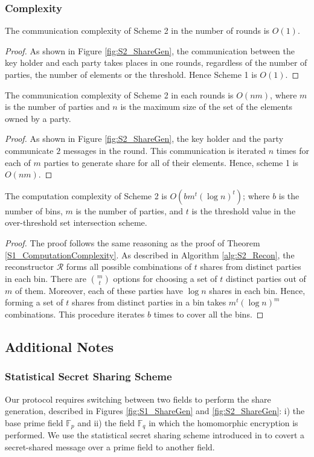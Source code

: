 \subsubsection{Complexity}
\begin{theorem}
The communication complexity of Scheme 2 in the number of rounds is $O(1)$. 
\end{theorem}
\begin{proof}
As shown in Figure \ref{fig:S2_ShareGen}, the communication between the key holder and each party takes places in one rounds, regardless of the number of parties, the number of elements or the threshold. Hence Scheme 1 is $O(1)$. 
\end{proof}
\begin{theorem}
The communication complexity of Scheme 2 in each rounds is $O(nm)$, where $m$ is the number of parties and $n$ is the maximum size of the set of the elements owned by a party. 
\end{theorem}
\begin{proof}
As shown in Figure \ref{fig:S2_ShareGen}, the key holder and the party communicate $2$ messages in the round. This communication is iterated $n$ times for each of $m$ parties to generate share for all of their elements. Hence, scheme 1 is $O(nm)$.  
\end{proof}
\begin{theorem}
The computation complexity of Scheme 2 is $O(b m^t (\log{n})^t)$; where $b$ is the number of bins, $m$ is the number of parties, and $t$ is the threshold value in the over-threshold set intersection scheme.
\end{theorem}
\begin{proof}
The proof follows the same reasoning as the proof of Theorem \ref{S1_ComputationComplexity}. 
As described in Algorithm \ref{alg:S2_Recon}, the reconstructor $\mathcal{R}$ forms all possible combinations of $t$ shares from distinct parties in each bin. There are $m \choose t$ options for choosing a set of $t$ distinct parties out of $m$ of them. Moreover, each of these parties have $\log{n}$ shares in each bin. Hence, forming a set of $t$ shares from distinct parties in a bin takes $m^t (\log{n})^m$ combinations. This procedure iterates $b$ times to cover all the bins.  
\end{proof}

\subsection{Additional Notes}
\subsubsection{Statistical Secret Sharing Scheme}
Our protocol requires switching between two fields to perform the share generation, described in Figures \ref{fig:S1_ShareGen} and \ref{fig:S2_ShareGen}: i) the base prime field $\mathbb{F}_p$ and ii) the field $\mathbb{F}_q$ in which the homomorphic encryption is performed. We use the statistical secret sharing scheme introduced in  \cite{Statistical_SSS} to covert a secret-shared message over a prime field to another field. 
